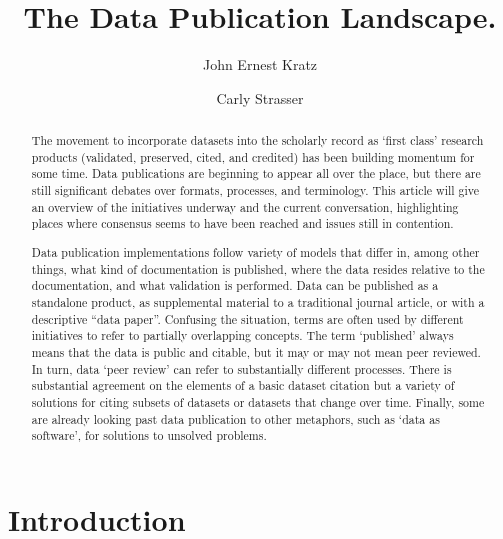 \documentclass[10pt,a4paper,twocolumn]{article}
\begin{document}
\title{The Data Publication Landscape.}
\author[1]{John Ernest Kratz}
\author[1]{Carly Strasser}

\maketitle
\thispagestyle{fancy}


\begin{abstract}

The movement to incorporate datasets into the scholarly record as `first class' research products (validated, preserved, cited, and credited) has been building momentum for some time.
Data publications are beginning to appear all over the place, but there are still significant debates over formats, processes, and terminology.
This article will give an overview of the initiatives underway and the current conversation, highlighting places where consensus seems to have been reached and issues still in contention.

Data publication implementations follow variety of models that differ in, among other things, what kind of documentation is published, where the data resides relative to the documentation, and what validation is performed. Data can be published as a standalone product, as supplemental material to a traditional journal article, or with a descriptive ``data paper''.
Confusing the situation, terms are often used by different initiatives to refer to partially overlapping concepts.
The term `published' always means that the data is public and citable, but it may or may not mean peer reviewed.
In turn, data `peer review' can refer to substantially different processes.
There is substantial agreement on the elements of a basic dataset citation but a variety of solutions for citing subsets of datasets or datasets that change over time.
Finally, some are already looking past data publication to other metaphors, such as `data as software', for solutions to unsolved problems.

\end{abstract}
\clearpage

\section*{Introduction}\label{introduction}
\end{document}

